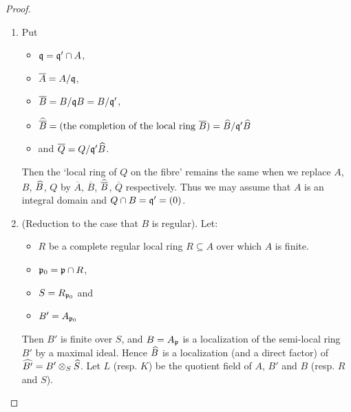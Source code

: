 \documentclass[../main]{subfiles}
\begin{document}
\begin{proof}\phantom{,}
\begin{enumerate}[label = Step \Roman*.]
    \item Put
    \begin{itemize}
        \item  ${\mathfrak{q}} = {\mathfrak{q}}' \cap A$,
        \item  $\overline A = A/{\mathfrak{q}}$,
        \item $\overline B = B/{\mathfrak{q}} B = B/{\mathfrak{q}}'$,
        \item  $\widehat{\overline B} = (\text {the completion of the local ring } \overline B) = {\widehat{B}}/{\mathfrak{q}}' \widehat{B}$
        \item  and $\overline Q = Q/{\mathfrak{q}}' \widehat{B}$.
    \end{itemize}
    Then the `local ring of $Q$ on the fibre' remains the same when we replace $A$, $B$, $\widehat{B}$, $Q$ by $\overline A$, $\overline B$, $\widehat{\overline B}$, $\overline Q$ respectively. Thus we may assume that $A$ is an integral domain and $Q \cap B = {\mathfrak{q}}' = (0)$.
    \item (Reduction to the case that $B$ is regular).
    Let: 
    \begin{itemize}
        \item $R$ be a complete regular local ring $R \subseteq A$ over which $A$ is finite.
        \item ${\mathfrak{p}}_0 = {\mathfrak{p}} \cap R$,
        \item $S = R_{{\mathfrak{p}}_0}$ and
        \item $B' = A_{{\mathfrak{p}}_0}$
    \end{itemize} Then $B'$ is finite over $S$, and $B = A_{\mathfrak{p}}$ is a localization of the semi-local ring $B'$ by a maximal ideal. Hence $\widehat{B}$ is a localization (and a direct factor) of $\widehat{B'} = B' \otimes_S {\widehat{S}}$. Let $L$ (resp. $K$) be the quotient field of $A$, $B'$ and $B$ (resp. $R$ and $S$).
    \begin{center}
    \end{center}


\end{enumerate}
\end{proof}
\end{document}
